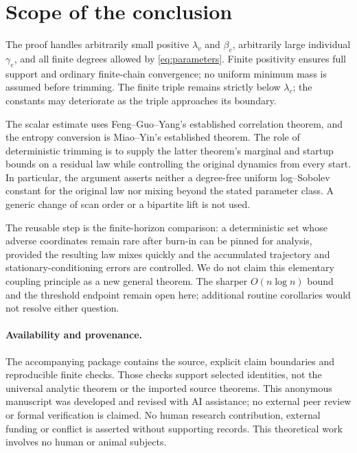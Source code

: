 \documentclass[11pt]{article}
\theoremstyle{remark}\newtheorem{remark}[theorem]{Remark}
\begin{document}
\section{Scope of the conclusion}

The proof handles arbitrarily small positive $\lambda_v$ and $\beta_e$,
arbitrarily large individual $\gamma_e$, and all finite degrees allowed
by \eqref{eq:parameters}. Finite positivity ensures full support and
ordinary finite-chain convergence; no uniform minimum mass is assumed
before trimming. The finite triple remains strictly below $\lambda_c$;
the constants may deteriorate as the triple approaches its boundary.

The scalar estimate uses Feng--Guo--Yang's established correlation
theorem, and the entropy conversion is Miao--Yin's established theorem.
The role of deterministic trimming is to supply the latter theorem's
marginal and startup bounds on a residual law while controlling the
original dynamics from every start. In particular, the argument asserts
neither a degree-free uniform log--Sobolev constant for the original law
nor mixing beyond the stated parameter class. A generic change of scan
order or a bipartite lift is not used.

The reusable step is the finite-horizon comparison: a deterministic set
whose adverse coordinates remain rare after burn-in can be pinned for
analysis, provided the resulting law mixes quickly and the accumulated
trajectory and stationary-conditioning errors are controlled. We do not
claim this elementary coupling principle as a new general theorem.
The sharper $O(n\log n)$ bound and the threshold endpoint remain open
here; additional routine corollaries would not resolve either question.

\paragraph{Availability and provenance.}
The accompanying package contains the source, explicit claim boundaries
and reproducible finite checks. Those checks support selected identities,
not the universal analytic theorem or the imported source theorems.
This anonymous manuscript was developed and revised with AI assistance;
no external peer review or formal verification is claimed. No human
research contribution, external funding or conflict is asserted without
supporting records. This theoretical work involves no human or animal
subjects.
\end{document}

